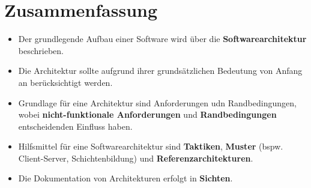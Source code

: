 \section{Zusammenfassung}


\begin{itemize}
    \item Der grundlegende Aufbau einer Software wird über die \textbf{Softwarearchitektur} beschrieben.
    \item Die Architektur sollte aufgrund ihrer grundsätzlichen Bedeutung von Anfang an berücksichtigt werden.
    \item Grundlage für eine Architektur sind Anforderungen udn Randbedingungen, wobei \textbf{nicht-funktionale Anforderungen} und \textbf{Randbedingungen} entscheidenden Einfluss haben.
    \item Hilfsmittel für eine Softwarearchitektur sind \textbf{Taktiken}, \textbf{Muster} (bspw. Client-Server, Schichtenbildung) und \textbf{Referenzarchitekturen}.
    \item Die Dokumentation von Architekturen erfolgt in \textbf{Sichten}.
\end{itemize}